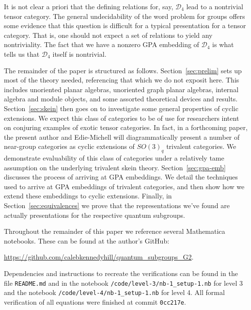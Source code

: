 \documentclass[pdflatex,sn-mathphys-num]{sn-jnl}%
\theoremstyle{thmstyleone}%
\theoremstyle{thmstyletwo}%
\theoremstyle{thmstylethree}%
\newcommand{\DD}{\mathcal{D}}
\begin{document}
It is not clear a priori that the defining relations for, say, $\DD_4$ lead to a nontrivial tensor category.
The general undecidability of the word problem for groups offers some evidence that this question is difficult
for a typical presentation for a tensor category.
That is, one should not expect a set of relations to yield any nontriviality.
The fact that we have a nonzero GPA embedding of $\DD_4$ is what tells us that $\DD_4$ itself is nontrivial.

The remainder of the paper is structured as follows.
Section~\ref{sec:prelim} sets up most of the theory needed, referencing that which we do not exposit here.
This includes unoriented planar algebras, unoriented graph planar algebras, 
internal algebra and module objects, and some assorted theoretical devices and results.
Section~\ref{sec:skein} then goes on to investigate some general properties of cyclic extensions.
We expect this class of categories to be of use for researchers intent on conjuring 
examples of exotic tensor categories.
In fact, in a forthcoming paper, the present author and Edie-Michell will diagrammatically
present a number of near-group categories as cyclic extensions of $SO(3)_q$ trivalent categories.
We demonstrate evaluability of this class of categories under a relatively tame assumption on the
underlying trivalent skein theory.
Section~\ref{sec:gpa-emb} discusses the process of arriving at GPA embeddings.
We detail the techniques used to arrive at GPA embeddings of trivalent categories, and then
show how we extend these embeddings to cyclic extensions.
Finally, in Section~\ref{sec:equivalences} we prove that the representations we've found 
are actually presentations for the respective quantum subgroups.

Throughout the remainder of this paper we reference several Mathematica notebooks.
These can be found at the author's GitHub:
\begin{center}
    \href{https://github.com/calebkennedyhill/quantum_subgroups_G2}{https://github.com/calebkennedyhill/quantum\_subgroups\_G2}.
\end{center}
Dependencies and instructions to recreate the verifications can be found in the file \verb|README.md|
and in the notebook \verb|/code/level-3/nb-1_setup-1.nb| for level 3 and the notebook 
\verb|/code/level-4/nb-1_setup-1.nb| for level 4.
All formal verification of all equations were finished at commit \verb|0cc217e|.
\end{document}
